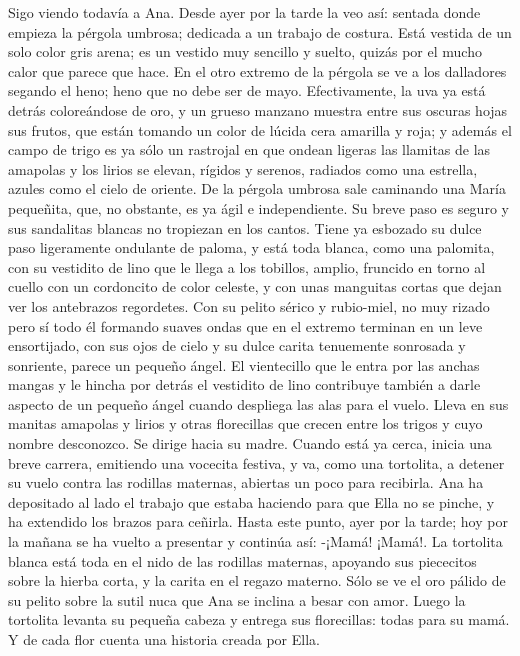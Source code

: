 \documentclass[12pt]{book} %
\begin{document}
Sigo viendo todavía a Ana. Desde ayer por la tarde la veo así: sentada donde empieza la pérgola umbrosa; dedicada a 
un trabajo de costura. Está vestida de un solo color gris arena; es un vestido muy sencillo y suelto, quizás por el mucho calor que parece que hace. 
En el otro extremo de la pérgola se ve a los dalladores segando el heno; heno que no debe ser de mayo. Efectivamente, la uva ya está detrás coloreándose de oro, y un grueso manzano muestra entre sus oscuras hojas sus frutos, que están tomando un color de lúcida cera amarilla y roja; y además el campo de trigo es ya sólo un rastrojal en que ondean ligeras las llamitas de las amapolas y los lirios se elevan, rígidos y serenos, radiados como una estrella, azules como el cielo de oriente. 
De la pérgola umbrosa sale caminando una María pequeñita, que, no obstante, es ya ágil e independiente. Su breve paso es seguro y sus sandalitas blancas no tropiezan en los cantos. Tiene ya esbozado su dulce paso ligeramente ondulante de paloma, y está toda blanca, como una palomita, con su vestidito de lino que le llega a los tobillos, amplio, fruncido en torno al cuello con un cordoncito de color celeste, y con unas manguitas cortas que dejan ver los antebrazos regordetes. Con su pelito sérico y rubio-miel, no muy rizado pero sí todo él formando suaves ondas que en el extremo terminan en un leve ensortijado, con sus ojos de cielo y su dulce carita tenuemente sonrosada y sonriente, parece un pequeño ángel. El vientecillo que le entra por las anchas mangas y le hincha por detrás el vestidito de lino contribuye también a darle aspecto de un pequeño ángel cuando despliega las alas para el vuelo. 
Lleva en sus manitas amapolas y lirios y otras florecillas que crecen entre los trigos y cuyo nombre desconozco. Se dirige hacia su madre. Cuando está ya cerca, inicia una breve carrera, emitiendo una vocecita festiva, y va, como una tortolita, a detener su vuelo contra las rodillas maternas, abiertas un poco para recibirla. Ana ha depositado al lado el trabajo que estaba haciendo para que Ella no se pinche, y ha extendido los brazos para ceñirla. 
Hasta este punto, ayer por la tarde; hoy por la mañana se ha vuelto a presentar y continúa así: 
-¡Mamá! ¡Mamá!. 
La tortolita blanca está toda en el nido de las rodillas maternas, apoyando sus piececitos sobre la hierba corta, y la 
carita en el regazo materno. Sólo se ve el oro pálido de su pelito sobre la sutil nuca que Ana se inclina a besar con amor. 
Luego la tortolita levanta su pequeña cabeza y entrega sus florecillas: todas para su mamá. Y de cada flor cuenta una 
historia creada por Ella. 
\end{document}
